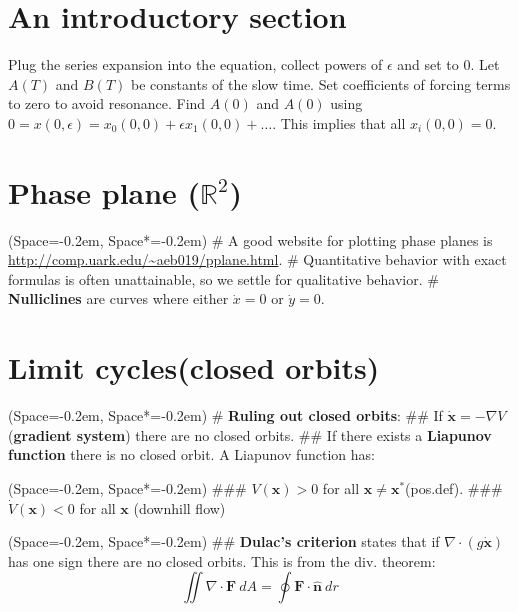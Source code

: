 \documentclass[11pt, a4paper]{article}
\newcommand{\listSpace}{-0.2em}%
\begin{document}
\section*{An introductory section}
Plug the series expansion into the equation, collect powers of $\epsilon$ and 
set to 0.
Let $A(T)$ and $B(T)$ be constants of the slow time.
Set coefficients of forcing terms to zero to avoid resonance.
Find $A(0)$ and $A(0)$ using $0 = x(0, \epsilon) = x_0 (0, 0) + \epsilon x_1 (0, 0) + \dots$. This implies that all $x_i(0,0) = 0$.
\begin{multicols}{2}
\section*{Phase plane ($\mathbb{R}^2$)}
\begin{easylist}[itemize]
	\ListProperties(Space=\listSpace, Space*=\listSpace)
	# A good website for plotting phase planes is \url{http://comp.uark.edu/~aeb019/pplane.html}.
	# Quantitative behavior with exact formulas is often unattainable,
	so we settle for qualitative behavior.
	# \textbf{Nulliclines} are curves where either $\dot{x} = 0$ or $\dot{y} = 
	0$.
\end{easylist}

\section*{Limit cycles(closed orbits)}
\begin{easylist}[itemize]
	\ListProperties(Space=\listSpace, Space*=\listSpace)
	# \textbf{Ruling out closed orbits}:
	## If $\dot{\mathbf{x}} = - \nabla V$ (\textbf{gradient system}) there are no closed orbits.
	## If there exists a \textbf{Liapunov function} there is no closed orbit.
	A Liapunov function has:
	\begin{easylist}[enumerate]
		\ListProperties(Space=\listSpace, Space*=\listSpace)
		### $V(\mathbf{x}) > 0$ for all $\mathbf{x} \neq \mathbf{x}^*$(pos.def).
		### $\dot{V}(\mathbf{x}) < 0$ for all $\mathbf{x}$ (downhill flow)
	\end{easylist}
\end{easylist}
\begin{easylist}[itemize]
	\ListProperties(Space=\listSpace, Space*=\listSpace)
	## \textbf{Dulac's criterion} states that if $\nabla \cdot \left(g \dot{\mathbf{x}}\right)$
	has one sign there are no closed orbits. This is from the div. theorem:
	\begin{equation*}
		\iint \nabla \cdot \mathbf{F} \ dA = \oint \mathbf{F} \cdot\hat{\mathbf{n}} \ dr
	\end{equation*}
	

\end{easylist}
\end{multicols}
\end{document}
